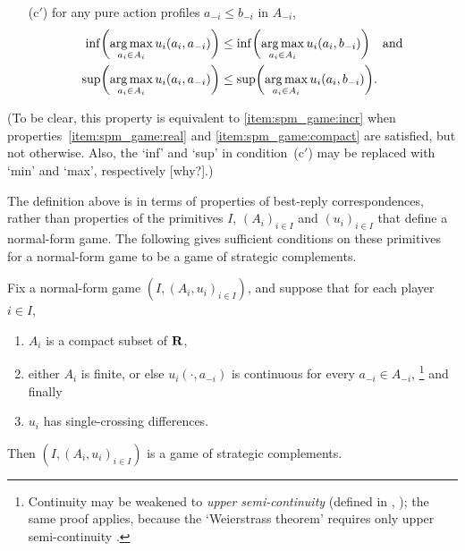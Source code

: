\begin{itemize}

	\item[(c$'$)] for any pure action profiles $a_{-i} \leq b_{-i}$ in $A_{-i}$,
	\begin{align*}
		\inf \left( \argmax_{a_i \in A_i} u_i(a_i,a_{-i}) \right)
		&\leq \inf \left( \argmax_{a_i \in A_i} u_i(a_i,b_{-i}) \right)
		\quad \text{and} \\
		\sup \left( \argmax_{a_i \in A_i} u_i(a_i,a_{-i}) \right)
		&\leq \sup \left( \argmax_{a_i \in A_i} u_i(a_i,b_{-i}) \right) .
	\end{align*}

\end{itemize}
%
(To be clear, this property is equivalent to \ref{item:spm_game:incr} when properties~\ref{item:spm_game:real} and \ref{item:spm_game:compact} are satisfied, but not otherwise. Also, the `inf' and `sup' in condition~(c$'$) may be replaced with `min' and `max', respectively [why?].)

The definition above is in terms of properties of best-reply correspondences, rather than properties of the primitives $I$, $(A_i)_{i \in I}$ and $(u_i)_{i \in I}$ that define a normal-form game. The following gives sufficient conditions on these primitives for a normal-form game to be a game of strategic complements.

\begin{corollary}
	\label{corollary:spm_game_microfound}
	Fix a normal-form game $(I,(A_i,u_i)_{i \in I})$, and suppose that for each player $i \in I$, 

	\begin{enumerate}[label=(\Alph*)]

		\item \label{item:spm_game_suff:real} $A_i$ is a compact subset of $\mathbf{R}$,

		\item \label{item:spm_game_suff:compact} either $A_i$ is finite, or else $u_i(\cdot,a_{-i})$ is continuous for every $a_{-i} \in A_{-i}$,%
			\footnote{Continuity may be weakened to \emph{upper semi-continuity} (defined in , ); the same proof applies, because the `Weierstrass theorem' requires only upper semi-continuity \parencite[see e.g.][Theorem~2.43, p.~44]{AliprantisBorder2006}.}
		and finally

		\item \label{item:spm_game_suff:scd} $u_i$ has single-crossing differences.
	
	\end{enumerate}
	Then $(I,(A_i,u_i)_{i \in I})$ is a game of strategic complements.
\end{corollary}

